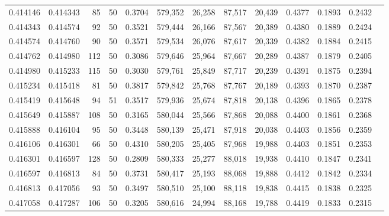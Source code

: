 \begin{tabular}{rrrrrrrrrrrrr}
0.414146 & 0.414343 &    85 &  50 &                                     0.3704 & 579,352 &  26,258 &  87,517 &  20,439 & 0.4377 & 0.1893 & 0.2432 \\
0.414343 & 0.414574 &    92 &  50 &                                     0.3521 & 579,444 &  26,166 &  87,567 &  20,389 & 0.4380 & 0.1889 & 0.2424 \\
0.414574 & 0.414760 &    90 &  50 &                                     0.3571 & 579,534 &  26,076 &  87,617 &  20,339 & 0.4382 & 0.1884 & 0.2415 \\
0.414762 & 0.414980 &   112 &  50 &                                     0.3086 & 579,646 &  25,964 &  87,667 &  20,289 & 0.4387 & 0.1879 & 0.2405 \\
0.414980 & 0.415233 &   115 &  50 &                                     0.3030 & 579,761 &  25,849 &  87,717 &  20,239 & 0.4391 & 0.1875 & 0.2394 \\
0.415234 & 0.415418 &    81 &  50 &                                     0.3817 & 579,842 &  25,768 &  87,767 &  20,189 & 0.4393 & 0.1870 & 0.2387 \\
0.415419 & 0.415648 &    94 &  51 &                                     0.3517 & 579,936 &  25,674 &  87,818 &  20,138 & 0.4396 & 0.1865 & 0.2378 \\
0.415649 & 0.415887 &   108 &  50 &                                     0.3165 & 580,044 &  25,566 &  87,868 &  20,088 & 0.4400 & 0.1861 & 0.2368 \\
0.415888 & 0.416104 &    95 &  50 &                                     0.3448 & 580,139 &  25,471 &  87,918 &  20,038 & 0.4403 & 0.1856 & 0.2359 \\
0.416106 & 0.416301 &    66 &  50 &                                     0.4310 & 580,205 &  25,405 &  87,968 &  19,988 & 0.4403 & 0.1851 & 0.2353 \\
0.416301 & 0.416597 &   128 &  50 &                                     0.2809 & 580,333 &  25,277 &  88,018 &  19,938 & 0.4410 & 0.1847 & 0.2341 \\
0.416597 & 0.416813 &    84 &  50 &                                     0.3731 & 580,417 &  25,193 &  88,068 &  19,888 & 0.4412 & 0.1842 & 0.2334 \\
0.416813 & 0.417056 &    93 &  50 &                                     0.3497 & 580,510 &  25,100 &  88,118 &  19,838 & 0.4415 & 0.1838 & 0.2325 \\
0.417058 & 0.417287 &   106 &  50 &                                     0.3205 & 580,616 &  24,994 &  88,168 &  19,788 & 0.4419 & 0.1833 & 0.2315 \\

\end{tabular}
